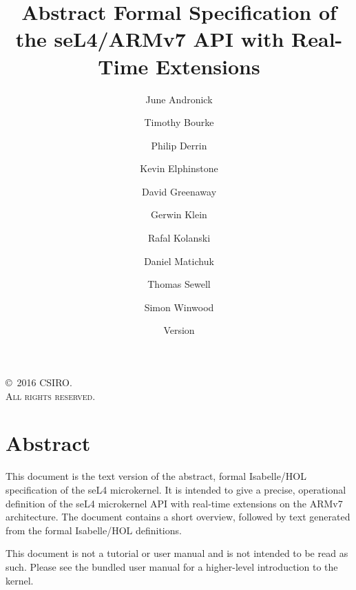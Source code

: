 \documentclass[10pt,a4paper]{scrbook}
\newcommand{\version}{}
\begin{document}
\title{Abstract Formal Specification of the seL4/ARMv7 API with Real-Time Extensions}

\date{Version \version}

\author{%
June Andronick \and
Timothy Bourke \and
Philip Derrin \and
Kevin Elphinstone \and
David Greenaway \and
Gerwin Klein \and
Rafal Kolanski \and
Daniel Matichuk \and
Thomas Sewell \and
Simon Winwood
}


\maketitle

\thispagestyle{empty}

\vfill

\copyright~2016 CSIRO.\\

\textsc{All rights reserved}. 

\clearpage

\chapter*{Abstract}
This document is the text version of the abstract, formal Isabelle/HOL
specification of the seL4 microkernel. It is intended to give a precise,
operational definition of the seL4 microkernel API with real-time extensions
on the ARMv7 architecture. The document contains a short overview, followed
by text generated from the formal Isabelle/HOL definitions.

This document is not a tutorial or user manual and is not intended to be read
as such. Please see the bundled user manual for a higher-level introduction to
the kernel.

\cleardoublepage

\tableofcontents





\end{document}
